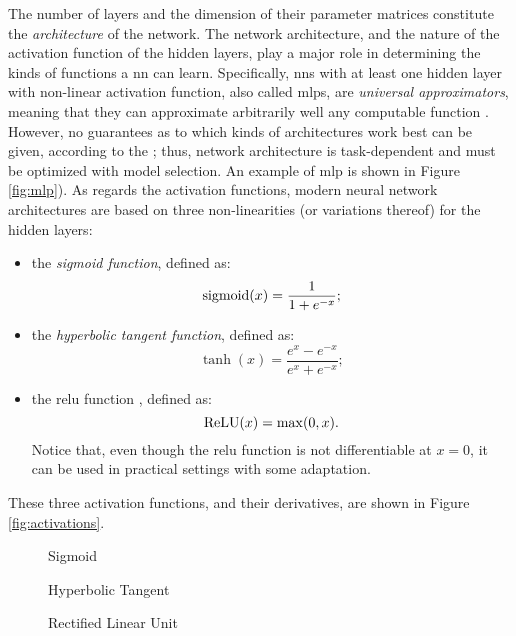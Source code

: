 The number of layers and the dimension of their parameter matrices constitute the \emph{architecture} of the network. The network architecture, and the nature of the activation function of the hidden layers, play a major role in determining the kinds of functions a \gls{nn} can learn. Specifically, \glspl{nn} with at least one hidden layer with non-linear activation function, also called \glspl{mlp}, are \emph{universal approximators}, meaning that they can approximate arbitrarily well any computable function \citep{cybenko1998approximationuniversal}. However, no guarantees as to which kinds of architectures work best can be given, according to the  \citep{wolpert1997freelunchtheorem}; thus, network architecture is task-dependent and must be optimized with model selection. An example of \gls{mlp} is shown in Figure \ref{fig:mlp}). As regards the activation functions, modern neural network architectures are based on three non-linearities (or variations thereof) for the hidden layers:
\begin{itemize}
    \item the \emph{sigmoid function}, defined as:
    $$\operatorname{sigmoid}(x) = \frac{1}{1 + e^{-x}};$$
    \item the \emph{hyperbolic tangent function}, defined as:
    $$\tanh(x) = \frac{e^x - e^{-x}}{e^x + e^{-x}};$$
    \item the \gls{relu} function \citep{glorot2011relu}, defined as:
    $$\operatorname{ReLU}(x) = \max(0, x).$$
    Notice that, even though the \gls{relu} function is not differentiable at $x = 0$, it can be used in practical settings with some adaptation.
\end{itemize}
These three activation functions, and their derivatives, are shown in Figure \ref{fig:activations}.
\begin{figure*}[h!]
    \begin{subfigure}[b]{0.32\linewidth}
        \centering
        \resizebox{.8\textwidth}{!}{}
        \caption{Sigmoid}
        \label{fig:sigmoid}
    \end{subfigure}
    \begin{subfigure}[b]{0.32\linewidth}
        \centering
        \resizebox{.8\textwidth}{!}{}
        \caption{Hyperbolic Tangent}
        \label{fig:hyptan}
    \end{subfigure}
    \begin{subfigure}[b]{0.32\linewidth}
        \centering
        \resizebox{.8\textwidth}{!}{}
        \caption{Rectified Linear Unit}
        \label{fig:relu}
    \end{subfigure}
    \caption{Examples of activation functions for the hidden layers (solid line) and their derivatives (dashed line).}
    \label{fig:activations}
\end{figure*}
